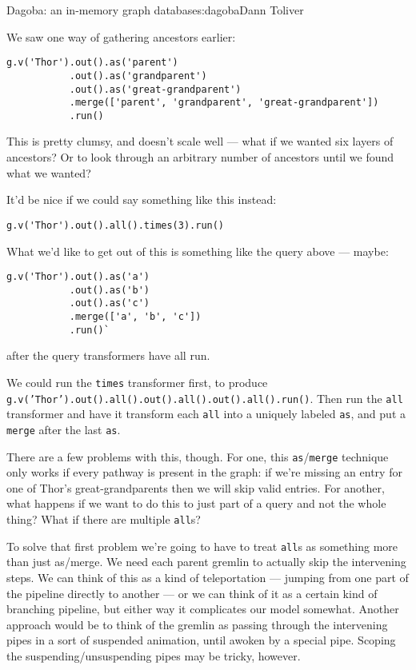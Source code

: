 \begin{aosachapter}{Dagoba: an in-memory graph database}{s:dagoba}{Dann Toliver}
\label{future-directions}

We saw one way of gathering ancestors earlier:

\begin{verbatim}
g.v('Thor').out().as('parent')
           .out().as('grandparent')
           .out().as('great-grandparent')
           .merge(['parent', 'grandparent', 'great-grandparent'])
           .run()
\end{verbatim}

This is pretty clumsy, and doesn't scale well --- what if we wanted six
layers of ancestors? Or to look through an arbitrary number of ancestors
until we found what we wanted?

It'd be nice if we could say something like this instead:

\begin{verbatim}
g.v('Thor').out().all().times(3).run()
\end{verbatim}

What we'd like to get out of this is something like the query above ---
maybe:

\begin{verbatim}
g.v('Thor').out().as('a')
           .out().as('b')
           .out().as('c')
           .merge(['a', 'b', 'c'])
           .run()`
\end{verbatim}

after the query transformers have all run.

We could run the \texttt{times} transformer first, to produce
\linebreak \texttt{g.v('Thor').out().all().out().all().out().all().run()}.
Then run the \texttt{all} transformer and have it transform each
\texttt{all} into a uniquely labeled \texttt{as}, and put a
\texttt{merge} after the last \texttt{as}.

There are a few problems with this, though. For one, this
\texttt{as}/\texttt{merge} technique only works if every pathway is
present in the graph: if we're missing an entry for one of Thor's
great-grandparents then we will skip valid entries. For another, what
happens if we want to do this to just part of a query and not the whole
thing? What if there are multiple \texttt{all}s?

To solve that first problem we're going to have to treat \texttt{all}s
as something more than just as/merge. We need each parent gremlin to
actually skip the intervening steps. We can think of this as a kind of
teleportation --- jumping from one part of the pipeline directly to
another --- or we can think of it as a certain kind of branching
pipeline, but either way it complicates our model somewhat. Another
approach would be to think of the gremlin as passing through the
intervening pipes in a sort of suspended animation, until awoken by a
special pipe. Scoping the suspending/unsuspending pipes may be tricky,
however.


\end{aosachapter}
